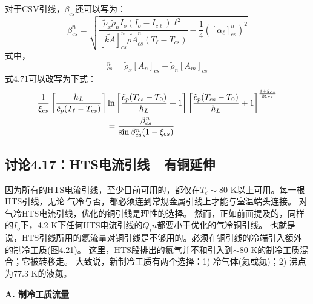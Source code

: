 对于CSV引线，$\beta_{cs}$还可以写为：
\begin{equation}%
\beta_{cs}^{n}=\sqrt{\frac{\tilde{\rho}_x\tilde{\rho}_nI_o(I_o-I_{c\ell})\ell^2}{[\tilde{kA}]_{cs}^{n}\tilde{\rho A}_{cs}^{n}(T_\ell-T_{cs})}-\frac{1}{4}([\alpha_\ell]_{cs}^{n})^2}
\end{equation}
式中，
\begin{equation}%
[\tilde{\rho A}]_{cs}^{n}=\tilde{\rho}_x[A_n]_{cs}+\tilde{\rho}_n[A_m]_{cs}
\end{equation}
式4.71可以改写为下式：
\begin{align}%
\frac{1}{\xi_{cs}}\left[\frac{h_L}{\tilde{c}_p(T_\ell-T_{cs})}\right]&\ln\left[\frac{\tilde{c}_p(T_{cs}-T_0)}{h_L}+1\right]\left[\frac{\tilde{c}_p(T_{cs}-T_0)}{h_L}+1\right]^{\frac{1+\xi_{cs}}{2\xi_{cs}}}\\
&=\frac{\beta_{cs}^{n}}{\sin\beta_{cs}^{n}(1-\xi_{cs})}\notag
\end{align}



\subsection{讨论4.17：HTS电流引线---有铜延伸}
因为所有的HTS电流引线，至少目前可用的，都仅在$T_\ell\sim$80 K以上可用。每一根HTS引线，无论
气冷与否，都必须连到常规金属引线上才能与室温端头连接。
对气冷HTS电流引线，优化的铜引线是理性的选择。
然而，正如前面提及的，同样的$I_o$下，4.2 K下任何HTS电流引线的$Q_in$都要小于优化的气冷铜引线。 
也就是说，HTS引线所用的氦流量对铜引线是不够用的。必须在铜引线的冷端引入额外的制冷工质(图4.21)。
这里，HTS段排出的氦气并不和引入到$\sim$80 K的制冷工质混合；它被转移走。 
大致说，新制冷工质有两个选择：1) 冷气体(氦或氮)；2) 沸点为77.3 K的液氮。

\textbf{A. 制冷工质流量}

